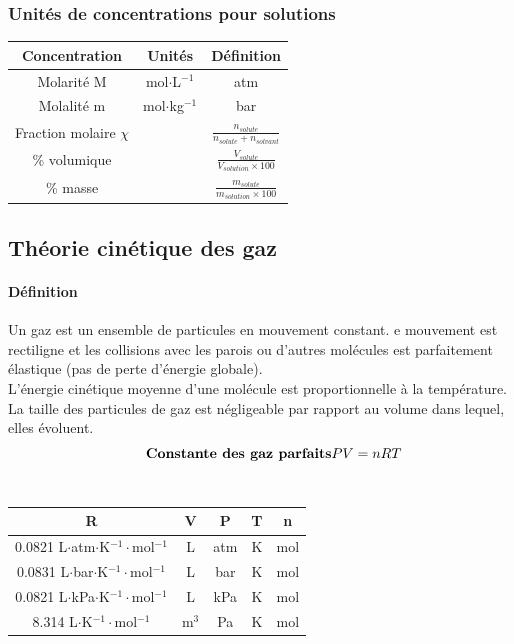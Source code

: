 \documentclass[10pt,a4paper]{book}
\begin{document}
\subsubsection{Unités de concentrations pour solutions}

\begin{center}
\begin{tabular}{| c | c | c |}
\hline
\textbf{Concentration} & \textbf{Unités} & \textbf{Définition} \\
\hline
Molarité M  & mol$\cdot$L$^{-1}$ & atm\\
\hline
Molalité m  & mol$\cdot$kg$^{-1}$ & bar \\
\hline
Fraction molaire $\chi$  &  & $\frac{n_{solute}}{n_{solute}+n_{solvant}} $\\
\hline
\% volumique  &   & $\frac{V_{solute}}{V_{solution}\times100}$\\
\hline
\% masse &  & $\frac{m_{solute}}{m_{solution}\times100}$ \\
\hline
\end{tabular}
\end{center}

\subsection{Théorie cinétique des gaz}

\paragraph{Définition} Un gaz est un ensemble de particules en mouvement constant. e mouvement est rectiligne et les collisions avec les parois ou d’autres molécules est parfaitement élastique (pas de perte d’énergie globale). \\
L’énergie cinétique moyenne d’une molécule est proportionnelle à la température. \\
La taille des particules de gaz est négligeable par rapport au volume dans lequel, elles évoluent. \\
\begin{displaymath}
\tag*{\textbf{Constante des gaz parfaits}}
PV = nRT \label{eq:PVNRT}
\end{displaymath}\\
\begin{center}
\begin{tabular}{| c | c | c | c | c |}
\hline
\textbf{R} & \textbf{V} & \textbf{P} & \textbf{T}  & \textbf{n} \\
\hline
0.0821 L$\cdot$atm$\cdot$K$^{-1}\cdot$mol$^{-1}$  & L & atm & K  & mol \\
\hline
0.0831 L$\cdot$bar$\cdot$K$^{-1}\cdot$mol$^{-1}$  & L & bar & K  & mol \\
\hline
0.0821 L$\cdot$kPa$\cdot$K$^{-1}\cdot$mol$^{-1}$  & L & kPa & K  & mol \\
\hline
8.314 L$\cdot$K$^{-1}\cdot$mol$^{-1}$  & m$^3$ & Pa & K  & mol \\
\hline
\end{tabular}
\end{center}
\end{document}
